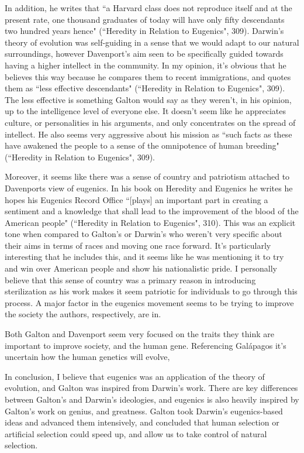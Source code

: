 \documentclass[11pt, oneside]{article}
\begin{document}
\par In addition, he writes that ``a Harvard class does not reproduce itself and at the present rate, one thousand graduates of today will have only fifty descendants two hundred years hence" (``Heredity in Relation to Eugenics", 309). Darwin's theory of evolution was self-guiding in a sense that we would adapt to our natural surroundings, however Davenport's aim seen to be specifically guided towards having a higher intellect in the community. In my opinion, it's obvious that he believes this way because he compares them to recent immigrations, and quotes them as ``less effective descendants" (``Heredity in Relation to Eugenics", 309). The less effective is something Galton would say as they weren't, in his opinion, up to the intelligence level of everyone else. It doesn't seem like he appreciates culture, or personalities in his arguments, and only concentrates on the spread of intellect. He also seems very aggressive about his mission as ``such facts as these have awakened the people to a sense of the omnipotence of human breeding" (``Heredity in Relation to Eugenics", 309). 

\par Moreover, it seems like there was a sense of country and patriotism attached to Davenports view of eugenics. In his book on Heredity and Eugenics he writes he hopes his Eugenics Record Office ``[plays] an important part in creating a sentiment and a knowledge that shall lead to the improvement of the blood of the American people" (``Heredity in Relation to Eugenics", 310). This was an explicit tone when compared to Galton's or Darwin's who weren't very specific about their aims in terms of races and moving one race forward. It's particularly interesting that he includes this, and it seems like he was mentioning it to try and win over American people and show his nationalistic pride. 
I personally believe that this sense of country was a primary reason in introducing sterilization as his work makes it seem patriotic for individuals to go through this process. A major factor in the eugenics movement seems to be trying to improve the society the authors, respectively, are in. 
\par Both Galton and Davenport seem very focused on the traits they think are important to improve society, and the human gene. Referencing Gal\'apagos it's uncertain how the human genetics will evolve, 

\par In conclusion, I believe that eugenics was an application of the theory of evolution, and Galton was inspired from Darwin's work. There are key differences between Galton's and Darwin's ideologies, and eugenics is also heavily inspired by Galton's work on genius, and greatness. Galton took Darwin's eugenics-based ideas and advanced them intensively, and concluded that human selection or artificial selection could speed up, and allow us to take control of natural selection. 
\end{document}
